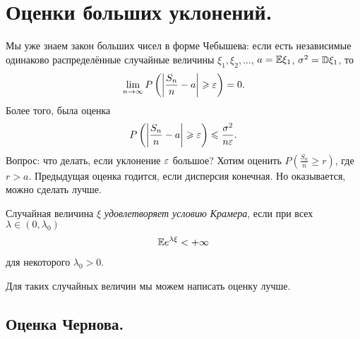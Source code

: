 \documentclass[../main.tex]{subfiles}
\begin{document}
\newpage
\section{Оценки больших уклонений.}
Мы уже знаем закон больших чисел в форме Чебышева: если есть независимые одинаково распределённые случайные величины $ \xi_1, \xi_2, \ldots $, $ a = \mathbb E\xi_1 $, $ \sigma^{2}=\mathbb D\xi_1 $, то
\begin{align*}
 \lim_{n \to \infty} P\left(\left|\frac{S_n}{n}  - a \right| \geqslant \varepsilon\right) = 0.
\end{align*} Более того, была оценка
\begin{align*}
 P \left( \left| \frac{S_n}{n}-a \right| \geqslant \varepsilon \right) \leqslant \frac{\sigma^{2}}{n\varepsilon}.
\end{align*} Вопрос: что делать, если уклонение $ \varepsilon $ большое? Хотим оценить $ P \left( \frac{S_n}{n} \geqslant r \right) $, где $ r > a $. Предыдущая оценка годится, если дисперсия конечная. Но оказывается, можно сделать лучше.

\begin{df}
 Случайная величина $ \xi $ \textit{удовлетворяет условию Крамера}, если при всех $ \lambda \in (0,\lambda_0) $
 \begin{align*}
  \mathbb E e^{\lambda\xi} < +\infty
 \end{align*} для некоторого $ \lambda_0 > 0$.
\end{df}
Для таких случайных величин мы можем написать оценку лучше.

\subsection{Оценка Чернова.}
\end{document}
